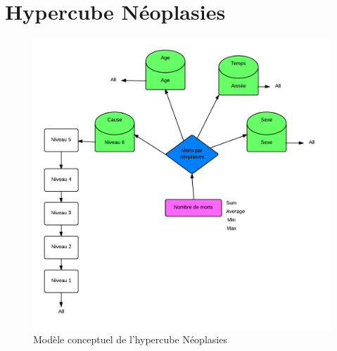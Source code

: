 \section{Hypercube Néoplasies}
\begin{figure}[h!]
    \centering
    \includegraphics[width=\linewidth]{images/cubeNeo.png}
    \caption{Modèle conceptuel de l'hypercube Néoplasies}
    \label{conception_cube_néoplasies}
\end{figure}

